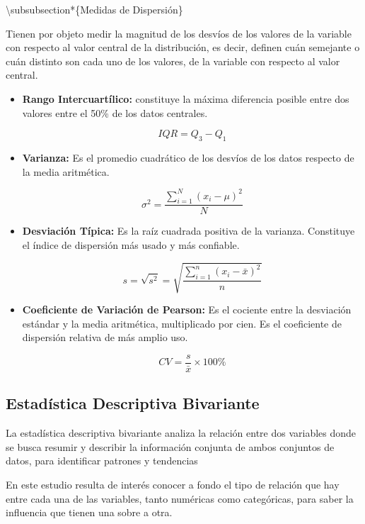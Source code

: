 \documentclass[oneside,11pt]{Latex/Classes/PhDthesisPSnPDF}
\begin{document}
\hfill\break

\textbackslash subsubsection*\{Medidas de Dispersión\}

Tienen por objeto medir la magnitud de los desvíos de los valores de la
variable con respecto al valor central de la distribución, es decir,
definen cuán semejante o cuán distinto son cada uno de los valores, de
la variable con respecto al valor central.

\begin{itemize}
\item{\textbf{Rango Intercuartílico:} constituye la máxima diferencia posible entre dos valores entre el 50\% de los datos centrales.}

$$IQR = Q_3 - Q_1$$

\item{\textbf{Varianza:} Es el promedio cuadrático de los desvíos de los datos respecto de la media aritmética.}

$$\sigma^2 = \frac{\sum_{i=1}^{N} (x_i - \mu)^2}{N}$$

\item{\textbf{Desviación Típica:} Es la raíz cuadrada positiva de la varianza. Constituye el índice de dispersión más usado y más confiable.}

$$s = \sqrt{s^2} = \sqrt{\frac{\sum_{i=1}^{n} (x_i - \bar{x})^2}{n}}$$

\item{\textbf{Coeficiente de Variación de Pearson:} Es el cociente entre la desviación estándar y la media aritmética, multiplicado por cien. Es el coeficiente de dispersión relativa de más amplio uso.}

$$CV =  \frac{s}{\bar{x}} \times 100\%$$
\end{itemize}

\hfill\break

\subsection{Estadística Descriptiva Bivariante}

La estadística descriptiva bivariante analiza la relación entre dos
variables donde se busca resumir y describir la información conjunta de
ambos conjuntos de datos, para identificar patrones y tendencias

En este estudio resulta de interés conocer a fondo el tipo de relación
que hay entre cada una de las variables, tanto numéricas como
categóricas, para saber la influencia que tienen una sobre a otra.\\
\end{document}
